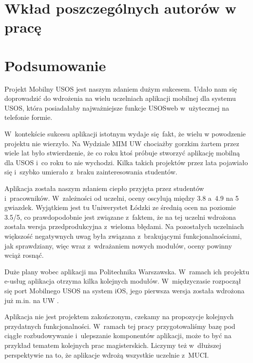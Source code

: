 \documentclass{pracamgr}
\begin{document}
\chapter{Wkład poszczególnych autorów w pracę}


\chapter{Podsumowanie}

Projekt Mobilny USOS jest naszym zdaniem dużym sukcesem. Udało nam się doprowadzić do
wdrożenia na wielu uczelniach aplikacji mobilnej dla systemu USOS, która posiadałaby
najważniejsze funkcje USOSweb w~użytecznej na telefonie formie.

W~kontekście sukcesu aplikacji istotnym wydaje się fakt, że wielu w powodzenie 
projektu nie wierzyło. Na Wydziale MIM UW chociażby gorzkim żartem przez wiele
lat było stwierdzenie, że co roku ktoś próbuje stworzyć aplikację mobilną dla USOS
i~co roku to nie wychodzi. Kilka takich projektów przez lata pojawiało się i~szybko
umierało z~braku zainteresowania studentów. 

Aplikacja została naszym zdaniem ciepło przyjęta przez studentów i~pracowników.
W~zależności od uczelni, oceny oscylują między 3.8 a~4.9 na 5 gwiazdek.
Wyjątkiem jest tu Uniwerystet Łódzki ze średnią ocen na poziomie 3.5/5, co prawdopodobnie
jest związane z~faktem, że na tej uczelni wdrożona została wersja przedprodukcyjna z~wieloma
błędami. Na pozostałych uczelniach większość negatywnych uwag była związana z~brakującymi
funkcjonalnościami, jak sprawdziany, więc wraz z~wdrażaniem nowych modułów, oceny powinny
wciąż rosnąć.

Duże plany wobec aplikacji ma Politechnika Warszawska. W~ramach ich projektu e-usług
aplikacja otrzyma kilka kolejnych modułów. W~międzyczasie
rozpoczął się port Mobilnego USOS na system iOS, jego pierwsza wersja została wdrożona
już m.in. na UW \cite{uw-ios, appstore}.

Aplikacja nie jest projektem zakończonym, czekamy na propozycje kolejnych przydatnych
funkcjonalności. W~ramach tej
pracy przygotowaliśmy bazę pod ciągłe rozbudowywanie i~ulepszanie komponentów aplikacji,
może to być na przykład tematem kolejnych prac magisterskich. Liczymy też w~dłuższej
perspektywie na to, że aplikacje wdrożą wszystkie uczelnie z~MUCI.

\appendix

\cleardoublepage
{}
{}
\listoffigures
\end{document}
